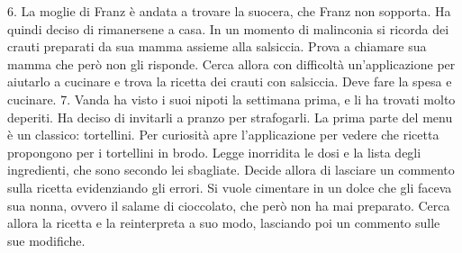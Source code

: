 6. La moglie di Franz è andata a trovare la suocera, che Franz non sopporta. Ha quindi deciso di rimanersene a casa. In un momento di malinconia si ricorda dei crauti preparati da sua mamma assieme alla salsiccia. Prova a chiamare sua mamma che però non gli risponde. Cerca allora con difficoltà un’applicazione per aiutarlo a cucinare e trova la ricetta dei crauti con salsiccia. Deve fare la spesa e cucinare.
7. Vanda ha visto i suoi nipoti la settimana prima, e li ha trovati molto deperiti. Ha deciso di invitarli a pranzo per strafogarli. La prima parte del menu è un classico: tortellini. Per curiosità apre l’applicazione per vedere che ricetta propongono per i tortellini in brodo. Legge inorridita le dosi e la lista degli ingredienti, che sono secondo lei sbagliate. Decide allora di lasciare un commento sulla ricetta evidenziando gli errori. Si vuole cimentare in un dolce che gli faceva sua nonna, ovvero il salame di cioccolato, che però non ha mai preparato. Cerca allora la ricetta e la reinterpreta a suo modo, lasciando poi un commento sulle sue modifiche.
